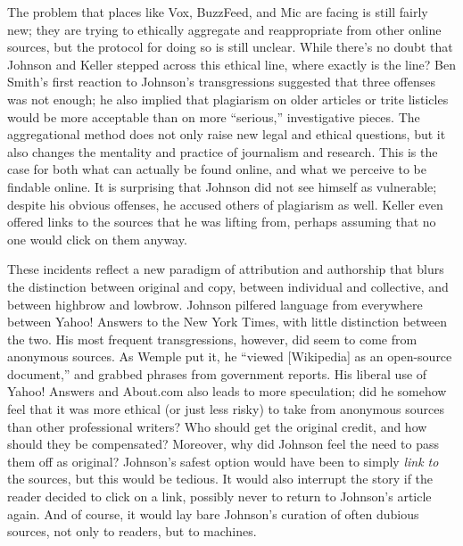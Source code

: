 The problem that places like Vox, BuzzFeed, and Mic are facing is still fairly new; they are trying to ethically aggregate and reappropriate from other online sources, but the protocol for doing so is still unclear. While there's no doubt that Johnson and Keller stepped across this ethical line, where exactly is the line? Ben Smith's first reaction to Johnson's transgressions suggested that three offenses was not enough; he also implied that plagiarism on older articles or trite listicles would be more acceptable than on more ``serious,'' investigative pieces. The aggregational method does not only raise new legal and ethical questions, but it also changes the mentality and practice of journalism and research. This is the case for both what can actually be found online, and what we perceive to be findable online. It is surprising that Johnson did not see himself as vulnerable; despite his obvious offenses, he accused others of plagiarism as well. Keller even offered links to the sources that he was lifting from, perhaps assuming that no one would click on them anyway.

These incidents reflect a new paradigm of attribution and authorship that blurs the distinction between original and copy, between individual and collective, and between highbrow and lowbrow. Johnson pilfered language from everywhere between Yahoo! Answers to the New York Times, with little distinction between the two. His most frequent transgressions, however, did seem to come from anonymous sources. As Wemple put it, he ``viewed [Wikipedia] as an open-source document,'' and grabbed phrases from government reports.\autocite{wemple_ravages_2014} His liberal use of Yahoo! Answers and About.com also leads to more speculation; did he somehow feel that it was more ethical (or just less risky) to take from anonymous sources than other professional writers? Who should get the original credit, and how should they be compensated? Moreover, why did Johnson feel the need to pass them off as original? Johnson's safest option would have been to simply \emph{link to} the sources, but this would be tedious. It would also interrupt the story if the reader decided to click on a link, possibly never to return to Johnson's article again. And of course, it would lay bare Johnson's curation of often dubious sources, not only to readers, but to machines.


